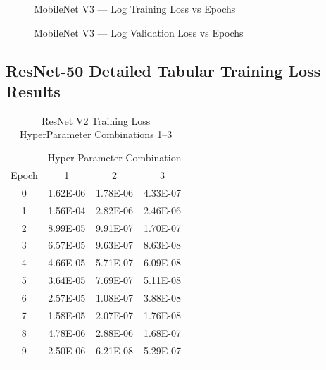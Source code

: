 \documentclass[10pt, conference]{IEEEtran}
\begin{document}
\begin{figure}[H]
    \centering
    
    \caption{MobileNet V3 --- Log Training Loss vs Epochs}
\end{figure}

\begin{figure}[H]
    \centering
    
    \caption{MobileNet V3 --- Log Validation Loss vs Epochs}
\end{figure}


\appendix %



\subsection{ResNet-50 Detailed Tabular Training Loss Results} %

\begin{table}[H]
    \centering
    \begin{tabular}{@{}cccc@{}}
        \toprule
        & \multicolumn{3}{c}{Hyper Parameter Combination} \\
        \cmidrule{2-4}
            Epoch  & 1 & 2 & 3\\
        \midrule

        0 & 1.62E-06 & 1.78E-06 & 4.33E-07 \\
        1 & 1.56E-04 & 2.82E-06 & 2.46E-06 \\
        2 & 8.99E-05 & 9.91E-07 & 1.70E-07 \\
        3 & 6.57E-05 & 9.63E-07 & 8.63E-08 \\
        4 & 4.66E-05 & 5.71E-07 & 6.09E-08 \\
        5 & 3.64E-05 & 7.69E-07 & 5.11E-08 \\
        6 & 2.57E-05 & 1.08E-07 & 3.88E-08 \\
        7 & 1.58E-05 & 2.07E-07 & 1.76E-08 \\
        8 & 4.78E-06 & 2.88E-06 & 1.68E-07 \\
        9 & 2.50E-06 & 6.21E-08 & 5.29E-07 \\

        \bottomrule\smallskip
    \end{tabular}
    \caption{ResNet V2 Training Loss HyperParameter Combinations 1--3}%
    \label{table:ResNetTrainingLoss1-3}
\end{table}
\end{document}
